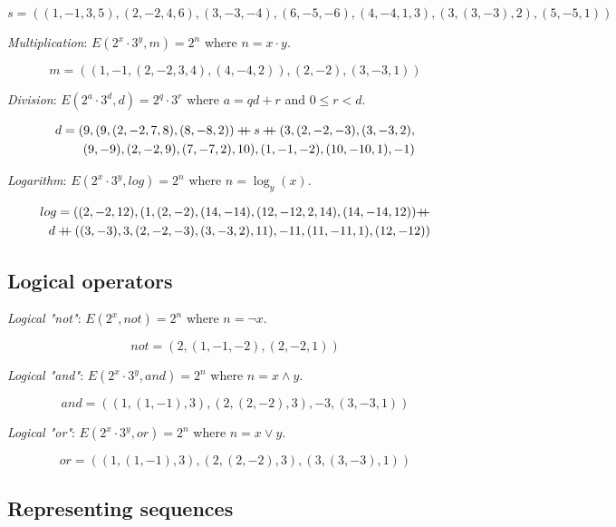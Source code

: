 \documentclass{article}
\newcommand\doubleplus{\mathbin{{+}\mspace{-8mu}{+}}}
\begin{document}
$$s = ((1, -1, 3, 5), (2, -2, 4, 6), (3, -3, -4), (6, -5, -6), (4, -4, 1, 3), (3, (3, -3), 2), (5, -5, 1))$$

\textit{Multiplication}: $E(2^x \cdot 3^y, m) = 2^n$ where $n = x \cdot y$.

$$m = ((1, -1, (2, -2, 3, 4), (4, -4, 2)), (2, -2), (3, -3, 1))$$

\textit{Division}: $E(2^a \cdot 3^d, d) = 2^q \cdot 3^r$ where $a = qd + r$ and $0 \leq r < d$.

\begin{equation*}
\begin{split}
d = (9, (9, (2, -2, 7, 8), (8, -8, 2)) \doubleplus s \doubleplus (3, (2, -2, -3), (3, -3, 2), \\
(9, -9), (2, -2, 9), (7, -7, 2), 10), (1, -1, -2), (10, -10, 1), -1)
\end{split}
\end{equation*}

\textit{Logarithm}: $E(2^x \cdot 3^y, log) = 2^n$ where $n = \log_y(x)$.

\begin{equation*}
\begin{split}
log = ((2, -2, 12), (1, (2, -2), (14, -14), (12, -12, 2, 14), (14, -14, 12)) \doubleplus \\
d \doubleplus ((3, -3), 3, (2, -2, -3), (3, -3, 2), 11), -11, (11, -11, 1), (12, -12))
\end{split}
\end{equation*}

\subsection{Logical operators}

\textit{Logical "not"}: $E(2^x, not) = 2^n$ where $n = \neg x$.

$$not = (2,(1,-1,-2),(2,-2,1))$$

\textit{Logical "and"}: $E(2^x \cdot 3^y, and) = 2^n$ where $n = x \land y$.

$$and = ((1,(1,-1),3),(2,(2,-2),3),-3,(3,-3,1))$$

\textit{Logical "or"}: $E(2^x \cdot 3^y, or) = 2^n$ where $n = x \lor y$.

$$or = ((1,(1,-1),3),(2,(2,-2),3),(3,(3,-3),1))$$

\subsection{Representing sequences}
\end{document}
